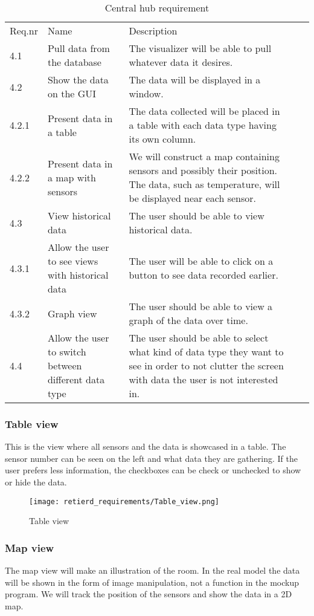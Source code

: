 \documentclass[../document]{subfiles}
\begin{document}
\begin{table}[H]
\caption{Central hub requirement}
\centering
\begin{tabularx}{\textwidth}{|l|X|X|l|X|}
\hline
\\ \hline Req.nr
&Name
&Description
\\ \hline 4.1
&Pull data from the database
&The visualizer will be able to pull whatever data it desires.
\\ \hline 4.2
&Show the data on the GUI
&The data will be displayed in a window.
\\ \hline 4.2.1
&Present data in a table
&The data collected will be placed in a table with each data type having its own column.
\\ \hline 4.2.2
&Present data in a map with sensors
&We will construct a map containing sensors and possibly their position. The data, such as temperature, will be displayed near each sensor.
\\ \hline 4.3
&View historical data
&The user should be able to view historical data.
\\ \hline 4.3.1
&Allow the user to see views with historical data
&The user will be able to click on a button to see data recorded earlier.
\\ \hline 4.3.2
&Graph view
&The user should be able to view a graph of the data over time.
\\ \hline 4.4
&Allow the user to switch between different data type
&The user should be able to select what kind of data type they want to see in order to not clutter the screen with data the user is not interested in.
\\ \hline 
\end{tabularx}
\end{table}

\subsubsection{Table view}
This is the view where all sensors and the data is showcased in a table. The sensor number can be seen on the left and what data they are gathering. If the user prefers less information, the checkboxes can be check or unchecked to show or hide the data.

\begin{figure}[H]
	\centering
	\texttt{[image: retierd\_requirements/Table\_view.png]}
	\caption{Table view}
\end{figure}

\subsubsection{Map view}
The map view will make an illustration of the room. In the real model the data will be shown in the form of image manipulation, not a function in the mockup program. We will track the position of the sensors and show the data in a 2D map.
\end{document}
